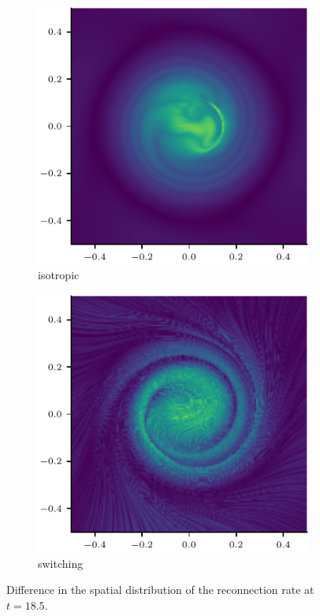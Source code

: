 
\begin{figure}[t]
  \centering
    \begin{subfigure}{0.49\textwidth}
      \includegraphics[width=\linewidth]{v-4r-4_reconn_rate_t_+18.5iso.pdf}
      \caption{isotropic}
      \label{fig:v-4r-4_reconn_rate_t_+18.5iso}
    \end{subfigure}
    \hfill
    \begin{subfigure}{0.49\textwidth}
      \includegraphics[width=\linewidth]{v-4r-4_reconn_rate_t_+18.5swi.pdf}
      \caption{switching}
      \label{fig:v-4r-4_reconn_rate_t_+18.5swi}
    \end{subfigure}
\caption{Difference in the spatial distribution of the reconnection rate at $t=18.5$.}
\label{fig:reconnection_rate_null_collapse}
\end{figure}


